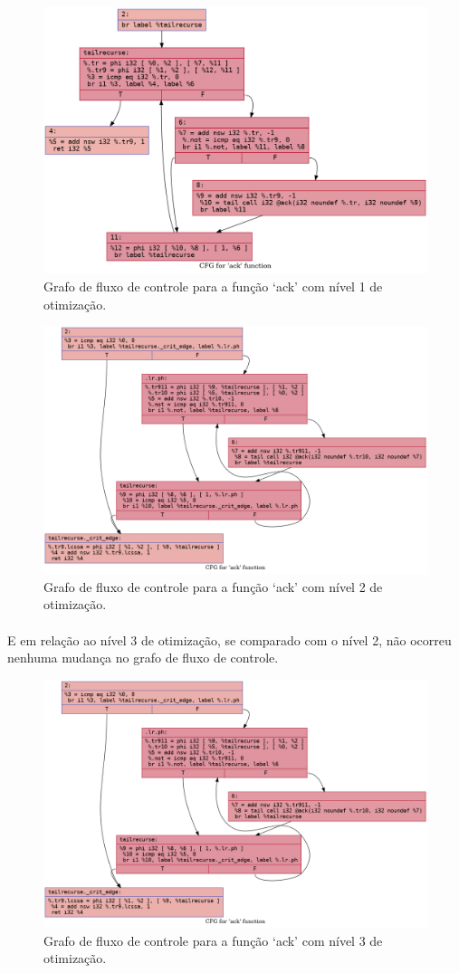 \documentclass[12pt]{article}
\begin{document}
\begin{figure}
    \centering
    \includegraphics[width=0.5\linewidth]{recursive_.ack_O1.png}
    \caption{Grafo de fluxo de controle para a função ‘ack’ com nível 1 de otimização.}
\end{figure}

\begin{figure}
    \centering
    \includegraphics[width=0.5\linewidth]{recursive_.ack_O2.png}
    \caption{Grafo de fluxo de controle para a função ‘ack’ com nível 2 de otimização.}
\end{figure}

\paragraph{}E em relação ao nível 3 de otimização, se comparado com o nível 2, não ocorreu nenhuma mudança no grafo de fluxo de controle.

\begin{figure}
    \centering
    \includegraphics[width=0.5\linewidth]{recursive_.ack_O3.png}
    \caption{Grafo de fluxo de controle para a função ‘ack’ com nível 3 de otimização.}
\end{figure}
\end{document}
